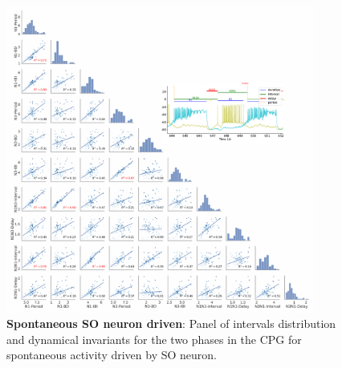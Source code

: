 \begin{figure}[htbp]
	\centering
	\includegraphics[width=0.9\textwidth]{./invariants/data/SUSSEX/prep4_so_driven_2/images/panel_with_pairplot.pdf}
	\caption{\textbf{Spontaneous SO neuron driven}: Panel of intervals distribution and dynamical invariants for the two phases in the CPG for spontaneous activity driven by SO neuron.}
	\label{fig:so spontaneous invariants pairplot}
\end{figure}
 	


